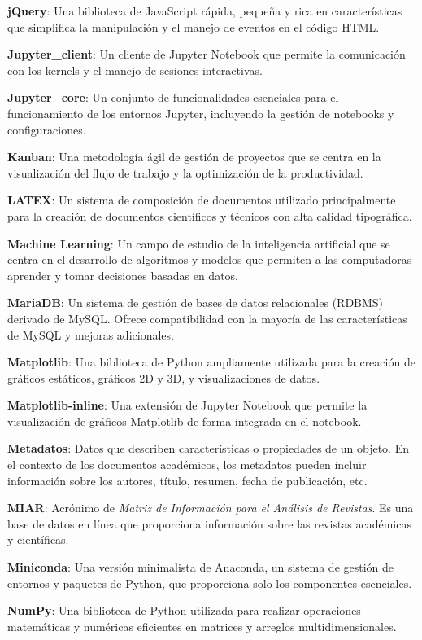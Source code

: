 \textbf{jQuery}: Una biblioteca de JavaScript rápida, pequeña y rica en características que simplifica la manipulación y el manejo de eventos en el código HTML.

\textbf{Jupyter\_client}: Un cliente de Jupyter Notebook que permite la comunicación con los kernels y el manejo de sesiones interactivas.

\textbf{Jupyter\_core}: Un conjunto de funcionalidades esenciales para el funcionamiento de los entornos Jupyter, incluyendo la gestión de notebooks y configuraciones.

\textbf{Kanban}: Una metodología ágil de gestión de proyectos que se centra en la visualización del flujo de trabajo y la optimización de la productividad.

\textbf{LATEX}: Un sistema de composición de documentos utilizado principalmente para la creación de documentos científicos y técnicos con alta calidad tipográfica.

\textbf{Machine Learning}: Un campo de estudio de la inteligencia artificial que se centra en el desarrollo de algoritmos y modelos que permiten a las computadoras aprender y tomar decisiones basadas en datos.

\textbf{MariaDB}: Un sistema de gestión de bases de datos relacionales (RDBMS) derivado de MySQL. Ofrece compatibilidad con la mayoría de las características de MySQL y mejoras adicionales.

\textbf{Matplotlib}: Una biblioteca de Python ampliamente utilizada para la creación de gráficos estáticos, gráficos 2D y 3D, y visualizaciones de datos.

\textbf{Matplotlib-inline}: Una extensión de Jupyter Notebook que permite la visualización de gráficos Matplotlib de forma integrada en el notebook.

\textbf{Metadatos}: Datos que describen características o propiedades de un objeto. En el contexto de los documentos académicos, los metadatos pueden incluir información sobre los autores, título, resumen, fecha de publicación, etc.

\textbf{MIAR}: Acrónimo de \textit{Matriz de Información para el Análisis de Revistas}. Es una base de datos en línea que proporciona información sobre las revistas académicas y científicas.

\textbf{Miniconda}: Una versión minimalista de Anaconda, un sistema de gestión de entornos y paquetes de Python, que proporciona solo los componentes esenciales.

\textbf{NumPy}: Una biblioteca de Python utilizada para realizar operaciones matemáticas y numéricas eficientes en matrices y arreglos multidimensionales.

